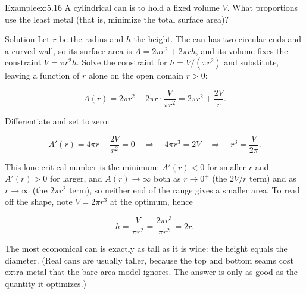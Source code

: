 \documentclass[a4paper,12pt,oneside]{memoir}
\begin{document}
\begin{workedexample}
\begin{envexample}{Example}{ex:5.16}{}
A cylindrical can is to hold a fixed volume \(V\). What proportions use the least metal (that is, minimize the total surface area)?
\end{envexample}
\begin{envsolution}{Solution}{}{}
Let \(r\) be the radius and \(h\) the height. The can has two circular ends and a curved wall, so its surface area is \(A = 2\pi r^{2} + 2\pi r h\), and its volume fixes the constraint \(V = \pi r^{2} h\). Solve the constraint for \(h = V/(\pi r^{2})\) and substitute, leaving a function of \(r\) alone on the open domain \(r > 0\):

\[ A(r) = 2\pi r^{2} + 2\pi r \cdot \frac{V}{\pi r^{2}} = 2\pi r^{2} + \frac{2V}{r}. \]

Differentiate and set to zero:

\[ A'(r) = 4\pi r - \frac{2V}{r^{2}} = 0 \quad\Longrightarrow\quad 4\pi r^{3} = 2V \quad\Longrightarrow\quad r^{3} = \frac{V}{2\pi}. \]

This lone critical number is the minimum: \(A'(r) < 0\) for smaller \(r\) and \(A'(r) > 0\) for larger, and \(A(r) \to \infty\) both as \(r \to 0^{+}\) (the \(2V/r\) term) and as \(r \to \infty\) (the \(2\pi r^{2}\) term), so neither end of the range gives a smaller area. To read off the shape, note \(V = 2\pi r^{3}\) at the optimum, hence

\[ h = \frac{V}{\pi r^{2}} = \frac{2\pi r^{3}}{\pi r^{2}} = 2r. \]

The most economical can is exactly as tall as it is wide: the height equals the diameter. (Real cans are usually taller, because the top and bottom seams cost extra metal that the bare-area model ignores. The answer is only as good as the quantity it optimizes.) \qedmark
\end{envsolution}
\end{workedexample}
\end{document}
